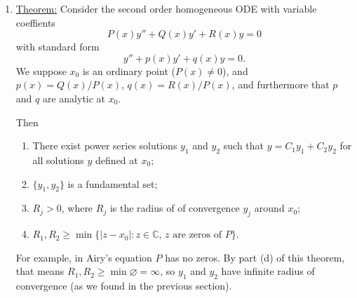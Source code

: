 \documentclass[11pt, letterpaper, oneside]{article}     %
\numberwithin{equation}{subsection}
\theoremstyle{definition}
\numberwithin{theorem}{section}
\theoremstyle{remark}
\newcommand{\CC}{\mathbb{C}}
\begin{document}
\begin{enumerate}
  \underline{Radius of convergence}
  Remember that power series functions are only defined within their radius of convergence. Let's check where our solution to the Airy's equation is actually defined!

  For $y_1(x)$,
  \begin{equation}
    b_n = \frac{a_0}{\prod_{k=1}^n(3k-1)(3k)}
  \end{equation}
  and so by the Ratio test
  \begin{align}
    R &= \frac{1}{\lim_{n\to\infty}\frac{|b_{n+1}|}{|b_n|}}\\
    &= \frac{1}{\lim_{n\to\infty}\frac{\prod_{k=1}^n(3k-1)(3k)}{\prod_{k=1}^{n+1}(3k-1)(3k)}}\\
    &= \frac{1}{\lim_{n\to\infty}\frac{1}{(3n-1)(3n)}}\\
    &= \infty.
  \end{align}
  Similarly, the radius of convergence of $y_2$ is also infinity. This means our power series converges everywhere and we have a solution on the whole real line.

  As a final remark, we can imagine expanding the solution around some other point $x_0 \neq 0$. If we do this, we get faster convergence around the new $x_0$, which is important for numerical applications. In addition, we can imagine situations in which $R < \infty$, in which case it would be necessary to find power series solutions around a collection of points; these solutions can in some cases be ``patched together'' to get a solution on a larger domain than just $[-R,R]$.

  \newpage

\item \underline{Theorem:} Consider the second order homogeneous ODE with variable coeffients
  \begin{equation}
    P(x)y'' + Q(x)y' + R(x)y = 0
  \end{equation}
  with standard form
  \begin{equation}
    y'' + p(x)y' + q(x)y = 0.
  \end{equation}
  We suppose $x_0$ is an ordinary point ($P(x) \neq 0$), and $p(x) = Q(x)/P(x)$, $q(x) = R(x)/P(x)$, and furthermore that $p$ and $q$ are analytic at $x_0$.

  Then
  \begin{enumerate}
  \item There exist power series solutions $y_1$ and $y_2$ such that $y = C_1y_1 + C_2y_2$ for all solutions $y$ defined at $x_0$;
  \item $\{y_1,y_2\}$ is a fundamental set;
  \item $R_j>0$, where $R_j$ is the radius of of convergence $y_j$ around $x_0$;
  \item $R_1,R_2 \geq \min\{|z-x_0|: z \in \CC, \,z\text{ are zeros of }P\}$.
  \end{enumerate}
  For example, in Airy's equation $P$ has no zeros. By part (d) of this theorem, that means $R_1,R_2 \geq \min \varnothing = \infty$, so $y_1$ and $y_2$ have infinite radius of convergence (as we found in the previous section).


\end{enumerate}
\end{document}
